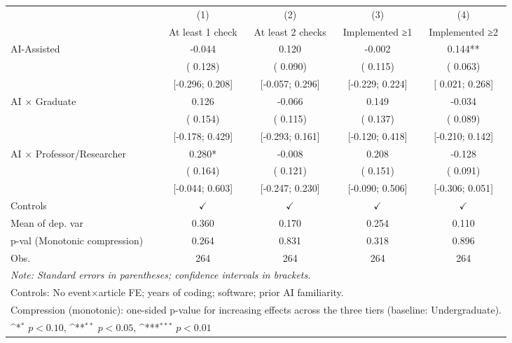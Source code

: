 \def\sym#1{\ifmmode^{#1}\else\(^{#1}\)\fi}
\begin{tabular}{l*{4}{c}}
\hline\hline
 & (1) & (2) & (3) & (4)
\\
 & At least 1 check & At least 2 checks & Implemented ≥1 & Implemented ≥2
 \\
\hline
AI-Assisted & -0.044 &  0.120 & -0.002 &  0.144**
\\
 & ( 0.128) & ( 0.090) & ( 0.115) & ( 0.063)
\\
 & [-0.296;  0.208] & [-0.057;  0.296] & [-0.229;  0.224] & [ 0.021;  0.268]
\\
AI × Graduate &  0.126 & -0.066 &  0.149 & -0.034
\\
 & ( 0.154) & ( 0.115) & ( 0.137) & ( 0.089)
\\
 & [-0.178;  0.429] & [-0.293;  0.161] & [-0.120;  0.418] & [-0.210;  0.142]
\\
AI × Professor/Researcher &  0.280* & -0.008 &  0.208 & -0.128
\\
 & ( 0.164) & ( 0.121) & ( 0.151) & ( 0.091)
\\
 & [-0.044;  0.603] & [-0.247;  0.230] & [-0.090;  0.506] & [-0.306;  0.051]
\\
\hline
Controls & $\checkmark$ & $\checkmark$ & $\checkmark$ & $\checkmark$
\\
Mean of dep. var &  0.360 &  0.170 &  0.254 &  0.110
\\
p-val (Monotonic compression) &  0.264 &  0.831 &  0.318 &  0.896
\\
Obs. & 264 & 264 & 264 & 264
\\
\hline
\hline\hline
\multicolumn{5}{l}{\it{Note:} Standard errors in parentheses; confidence intervals in brackets.}\\
\multicolumn{5}{l}{Controls: No event×article FE; years of coding; software; prior AI familiarity.}\\
\multicolumn{5}{l}{Compression (monotonic): one-sided p-value for increasing effects across the three tiers (baseline: Undergraduate).}\\
\multicolumn{5}{l}{\sym{*} $p<0.10$, \sym{**} $p<0.05$,  \sym{***} $p<0.01$}\\
\end{tabular}
